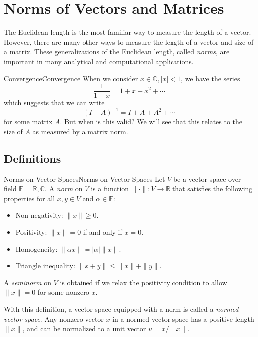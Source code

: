 \documentclass[../main.tex]{subfiles}
\begin{document}
\chapter{Norms of Vectors and Matrices}

The Euclidean length is the most familiar way to measure the length of a vector. However, there are many other ways to measure the length of a vector and size of a matrix. These generalizations of the Euclidean length, called \textit{norms}, are important in many analytical and computational applications.

\begin{example}{Convergence}{Convergence}
  When we consider $x\in \mathbb{C}, |x|<1$, we have the series
  \begin{equation*}
    \frac{1}{1-x} = 1 + x + x^2 + \cdots
  \end{equation*}
  which suggests that we can write
  \begin{equation*}
    (I - A)^{-1} = I + A + A^2 + \cdots
  \end{equation*}
  for some matrix $A$. But when is this valid? We will see that this relates to the size of $A$ as measured by a matrix norm.
\end{example}

\section{Definitions}

\begin{definition}{Norms on Vector Spaces}{Norms on Vector Spaces}
  Let $V$ be a vector space over field $\mathbb{F} = \mathbb{R}, \mathbb{C}$. A \textit{norm} on $V$ is a function $\|\cdot\|: V \to \mathbb{R}$ that satisfies the following properties for all $x, y \in V$ and $\alpha \in \mathbb{F}$:
  \begin{itemize}
    \item Non-negativity: $\|x\| \geq 0$.
    \item Positivity: $\|x\| = 0$ if and only if $x = 0$.
    \item Homogeneity: $\|\alpha x\| = |\alpha| \|x\|$.
    \item Triangle inequality: $\|x + y\| \leq \|x\| + \|y\|$.
  \end{itemize}
  A \emph{seminorm} on $V$ is obtained if we relax the positivity condition to allow $\|x\| = 0$ for some nonzero $x$.
\end{definition}

With this definition, a vector space equipped with a norm is called a \textit{normed vector space}. Any nonzero vector $x$ in a normed vector space has a positive length $\|x\|$, and can be normalized to a unit vector $u = x / \|x\|$.
\end{document}
